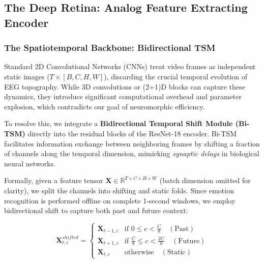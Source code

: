\documentclass[conference]{IEEEtran}
\begin{document}
\subsection{The Deep Retina: Analog Feature Extracting Encoder} %




\subsubsection{The Spatiotemporal Backbone: Bidirectional TSM}
Standard 2D Convolutional Networks (CNNs) treat video frames as independent static images ($T \times [B, C, H, W]$), discarding the crucial temporal evolution of EEG topography. While 3D convolutions or (2+1)D blocks can capture these dynamics, they introduce significant computational overhead and parameter explosion, which contradicts our goal of neuromorphic efficiency.

To resolve this, we integrate a \textbf{Bidirectional Temporal Shift Module (Bi-TSM)} \cite{Lin2019} directly into the residual blocks of the ResNet-18 encoder. Bi-TSM facilitates information exchange between neighboring frames by shifting a fraction of channels along the temporal dimension, mimicking \textit{synaptic delays} in biological neural networks.

Formally, given a feature tensor $\mathbf{X} \in \mathbb{R}^{T \times C \times H \times W}$ (batch dimension omitted for clarity), we split the channels into shifting and static folds. Since emotion recognition is performed offline on complete 1-second windows, we employ bidirectional shift to capture both past and future context:

\begin{equation}
    \mathbf{X}_{t, c}^{shifted} = 
    \begin{cases} 
      \mathbf{X}_{t-1, c} & \text{if } 0 \le c < \frac{C}{8} \quad (\text{Past}) \\
      \mathbf{X}_{t+1, c} & \text{if } \frac{C}{8} \le c < \frac{2C}{8} \quad (\text{Future}) \\
      \mathbf{X}_{t, c} & \text{otherwise} \quad (\text{Static})
   \end{cases}
\end{equation}
\end{document}
